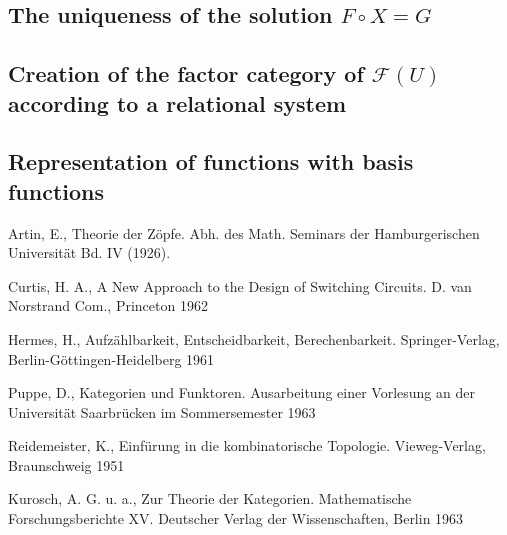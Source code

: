 \documentclass{article}
\begin{document}
\subsection{The uniqueness of the solution $F \circ X = G$}
\subsection{Creation of the factor category of $\mathcal{F}(U)$ according to a relational system}
\subsection{Representation of functions with basis functions}

\begin{thebibliography}{9}
Artin, E., Theorie der Zöpfe. Abh. des Math. Seminars der Hamburgerischen Universit\"{a}t Bd. IV (1926).

Curtis, H. A., A New Approach to the Design of Switching Circuits. D. van Norstrand Com., Princeton 1962

Hermes, H., Aufz\"{a}hlbarkeit, Entscheidbarkeit, Berechenbarkeit. Springer-Verlag, Berlin-G\"{o}ttingen-Heidelberg 1961

Puppe, D., Kategorien und Funktoren. Ausarbeitung einer Vorlesung an der Universit\"{a}t Saarbr\"{u}cken im Sommersemester 1963

Reidemeister, K., Einf\"{u}rung in die kombinatorische Topologie. Vieweg-Verlag, Braunschweig 1951

Kurosch, A. G. u. a., Zur Theorie der Kategorien. Mathematische Forschungsberichte XV. Deutscher Verlag der Wissenschaften, Berlin 1963
\end{thebibliography}
\end{document}
